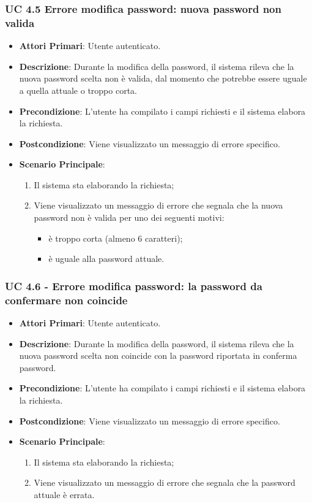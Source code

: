 			\subsubsection{UC 4.5 Errore modifica password: nuova password non valida}
			\begin{itemize}
				\item \textbf{Attori Primari}: Utente autenticato.
				\item \textbf{Descrizione}: Durante la modifica della password, il sistema rileva che la nuova password scelta non è valida, dal momento che potrebbe essere uguale a quella attuale o troppo corta.
				\item \textbf{Precondizione}: L'utente ha compilato i campi richiesti e il sistema elabora la richiesta.
				\item \textbf{Postcondizione}: Viene visualizzato un messaggio di errore specifico.
				\item \textbf{Scenario Principale}:
				\begin{enumerate}
					\item Il sistema sta elaborando la richiesta;
					\item Viene visualizzato un messaggio di errore che segnala che la nuova password non è valida per uno dei seguenti motivi:
					\begin{itemize}
						\item è troppo corta (almeno 6 caratteri);
						\item è uguale alla password attuale.
					\end{itemize}
				\end{enumerate}
			\end{itemize}

			\subsubsection{UC 4.6 - Errore modifica password: la password da confermare non coincide}
			\begin{itemize}
				\item \textbf{Attori Primari}: Utente autenticato.
				\item \textbf{Descrizione}: Durante la modifica della password, il sistema rileva che la nuova password scelta non coincide con la password riportata in conferma password.
				\item \textbf{Precondizione}: L'utente ha compilato i campi richiesti e il sistema elabora la richiesta.
				\item \textbf{Postcondizione}: Viene visualizzato un messaggio di errore specifico.
				\item \textbf{Scenario Principale}:
				\begin{enumerate}
					\item Il sistema sta elaborando la richiesta;
					\item Viene visualizzato un messaggio di errore che segnala che la password attuale è errata.
				\end{enumerate}
			\end{itemize}
			
